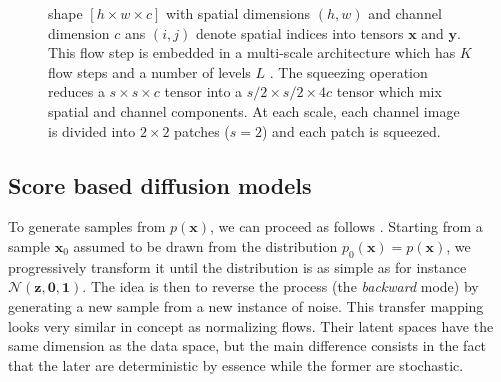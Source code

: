 \documentclass[11pt]{amsart}
\begin{document}
\begin{figure}
{shape $[h \times w \times c]$ with spatial dimensions $(h, w)$ and channel dimension $c$ ans $(i, j)$ denote
spatial indices into tensors $\bm{x}$ and $\bm{y}$.  This flow step is embedded in a multi-scale  architecture which has $K$ flow steps and a number of levels $L$ \citep{2016arXiv160508803D}. The squeezing operation reduces a $s \times s \times c$ tensor  into a $s/2\times s/2 \times 4c$ tensor which mix spatial and channel components. At each scale, each channel image is divided into $2\times 2$ patches ($s=2$) and each patch is squeezed. }
    \label{fig-Glow-archi}
\end{figure}
\subsection{Score based diffusion models}
%
To generate samples from $p(\bm{x})$, we can proceed as follows \citep[e.g][]{Chang2023,LinYang2023}. Starting from a sample $\bm{x}_0$ assumed to be drawn from the distribution $p_0(\bm{x})=p(\bm{x})$, we progressively transform it until the  distribution is as simple as for instance $\mathcal{N}(\bm{z},\bm{0},\bm{1})$.  The idea is then to reverse the process (the \textit{backward} mode) by generating a new sample from a new instance of noise. This transfer mapping looks very similar in concept as normalizing flows. Their latent spaces have the same dimension as the data space, but the main difference consists in the fact that the later are deterministic by essence while the former are stochastic. 
\end{document}
